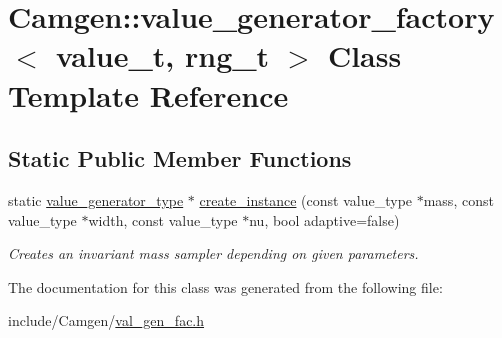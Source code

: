 \hypertarget{a00578}{}\section{Camgen\+:\+:value\+\_\+generator\+\_\+factory$<$ value\+\_\+t, rng\+\_\+t $>$ Class Template Reference}
\label{a00578}
\subsection*{Static Public Member Functions}
\begin{DoxyCompactItemize}
\item 
\hypertarget{a00578_afbf6fd019d9842b4ec070c21e4ffbe69}{}static \hyperlink{a00577}{value\+\_\+generator\+\_\+type} $\ast$ \hyperlink{a00578_afbf6fd019d9842b4ec070c21e4ffbe69}{create\+\_\+instance} (const value\+\_\+type $\ast$mass, const value\+\_\+type $\ast$width, const value\+\_\+type $\ast$nu, bool adaptive=false)\label{a00578_afbf6fd019d9842b4ec070c21e4ffbe69}

\begin{DoxyCompactList}\small\item\em Creates an invariant mass sampler depending on given parameters. \end{DoxyCompactList}\end{DoxyCompactItemize}


The documentation for this class was generated from the following file\+:\begin{DoxyCompactItemize}
\item 
include/\+Camgen/\hyperlink{a00829}{val\+\_\+gen\+\_\+fac.\+h}\end{DoxyCompactItemize}
